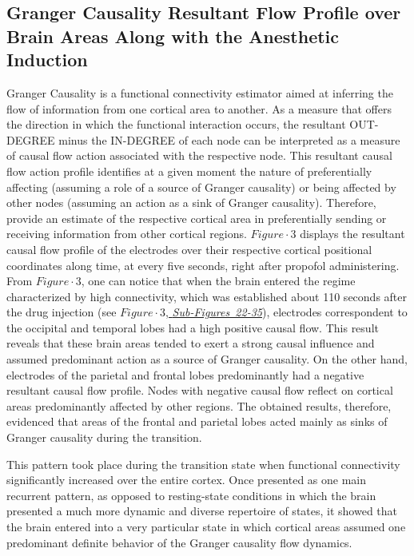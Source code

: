 \documentclass[twoside]{article}
\begin{document}
\begin{multicols}{2}



\subsection{Granger Causality Resultant Flow Profile over Brain Areas Along with the Anesthetic Induction}


Granger Causality is a functional connectivity estimator aimed at inferring the flow of information from one cortical area to another. As a measure that offers the direction in which the functional interaction occurs, the resultant OUT-DEGREE minus the IN-DEGREE of each node can be interpreted as a measure of causal flow action associated with the respective node. This resultant causal flow action profile identifies at a given moment the nature of preferentially affecting (assuming a role of a source of Granger causality) or being affected by other nodes (assuming an action as a sink of Granger causality). Therefore, provide an estimate of the respective cortical area in preferentially sending or receiving information from other cortical regions. 
\hyperlink{FIGURE3}{$Figure \cdot 3$} displays the resultant causal flow profile of the electrodes over their respective cortical positional coordinates along time, at every five seconds, right after propofol administering. From \hyperlink{FIGURE3}{$Figure \cdot 3$}, one can notice that when the brain entered the regime characterized by high connectivity, which was established about 110 seconds after the drug injection (see \hyperlink{FIGURE3}{$Figure \cdot 3$, \mbox{\textit{Sub-Figures 22-35}}}),
electrodes correspondent to the occipital and temporal lobes had a high positive causal flow. This result reveals that these brain areas tended to exert a strong causal influence and assumed predominant action as a source of Granger causality. On the other hand, electrodes of the parietal and frontal lobes predominantly had a negative resultant causal flow profile. Nodes with negative causal flow reflect on cortical areas predominantly affected by other regions. The obtained results, therefore, evidenced that areas of the frontal and parietal lobes acted mainly as sinks of Granger causality during the transition. 

This pattern took place during the transition state when functional connectivity significantly increased over the entire cortex. Once presented as one main recurrent pattern, as opposed to resting-state conditions in which the brain presented a much more dynamic and diverse repertoire of states, it showed that the brain entered into a very particular state in which cortical areas assumed one predominant definite behavior of the Granger causality flow dynamics.


\end{multicols}
\end{document}
